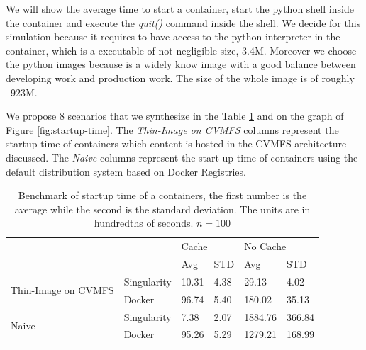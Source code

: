 We will show the average time to start a container, start the python shell
inside the container and execute the \textit{quit()} command inside the shell.
We decide for this simulation because it requires to have access to  the python
interpreter in the container, which is a executable of not negligible size,
3.4M. Moreover we choose the python images because is a widely know image with
a good balance between developing work and production work. The size of the
whole image is of roughly ~923M.

We propose 8 scenarios that we synthesize in the Table \ref{tab:benchmark} and
on the graph of Figure \ref{fig:startup-time}. The \textit{Thin-Image on CVMFS}
columns represent the startup time of containers which content is hosted in the
CVMFS architecture discussed. The \textit{Naive} columns represent the start up
time of containers using the default distribution system based on Docker
Registries.

\begin{table}[]
\begin{tabular}{|l|l|l|l|l|l|}
\hline
\multicolumn{2}{|l|}{\multirow{2}{*}{}}            & \multicolumn{2}{l|}{Cache} & \multicolumn{2}{l|}{No Cache} \\ \cline{3-6} 
\multicolumn{2}{|l|}{}                             & Avg          & STD         & Avg            & STD          \\ \hline \hline
\multirow{2}{*}{Thin-Image on CVMFS} & Singularity & 10.31        & 4.38        & 29.13          & 4.02         \\ \cline{2-6} 
                                     & Docker      & 96.74        & 5.40        & 180.02         & 35.13        \\ \hline \hline
\multirow{2}{*}{Naive}               & Singularity & 7.38         & 2.07        & 1884.76        & 366.84       \\ \cline{2-6} 
                                     & Docker      & 95.26        & 5.29        & 1279.21        & 168.99       \\ \hline
\end{tabular}
\caption{Benchmark of startup time of a containers, the first number is the average while the second is the standard deviation. The units are in hundredths of seconds. $n = 100$}
\label{tab:benchmark}
\end{table}

